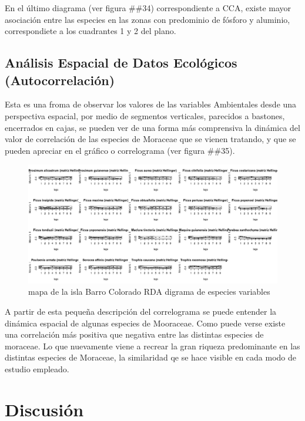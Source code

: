 \documentclass[11pt,]{article}
\begin{document}
En el último diagrama (ver figura \#\#34) correspondiente a CCA, existe
mayor asociación entre las especies en las zonas con predominio de
fósforo y aluminio, correspondiete a los cuadrantes 1 y 2 del plano.

\subsection{Análisis Espacial de Datos Ecológicos
(Autocorrelación)}\label{anuxe1lisis-espacial-de-datos-ecoluxf3gicos-autocorrelaciuxf3n}

Esta es una froma de observar los valores de las variables Ambientales
desde una perspectiva espacial, por medio de segmentos verticales,
parecidos a bastones, encerrados en cajas, se pueden ver de una forma
más comprensiva la dinámica del valor de correlación de las especies de
Moraceae que se vienen tratando, y que se pueden apreciar en el gráfico
o correlograma (ver figura \#\#35).

\begin{figure}
\centering
\includegraphics[width=1.00000\textwidth]{multiples_especies.png}
\caption{mapa de la isla Barro Colorado RDA digrama de especies
variables\label{fig:bci_map}}
\end{figure}

A partir de esta pequeña descripción del correlograma se puede entender
la dinámica espacial de algunas especies de Mooraceae. Como puede verse
existe una correlación más positiva que negativa entre las distintas
especies de moraceae. Lo que nuevamente viene a recrear la gran riqueza
predominante en las distintas especies de Moraceae, la similaridad qe se
hace visible en cada modo de estudio empleado.

\section{Discusión}\label{discusiuxf3n}
\end{document}
